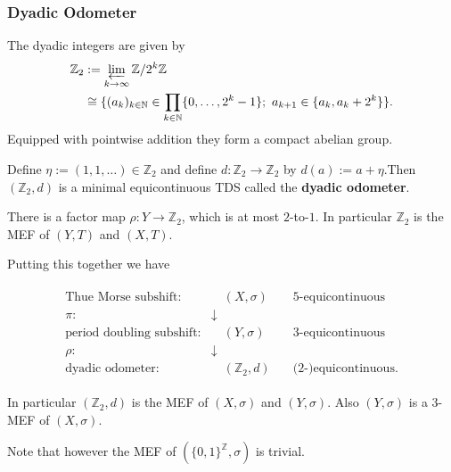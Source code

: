 \begin{frame}
	\frametitle{Dyadic Odometer}
	The dyadic integers are given by
	\begin{align*}
		\mathbb{Z}_2 &:= \varprojlim_{k \to \infty} \mathbb{Z}/2^k\mathbb{Z}\\
		&\cong \{(a_k)_{k \in \mathbb{N}} \in \prod_{k \in \mathbb{N}} \{0, \dots, 2^k-1\};\ a_{k+1} \in \{a_k, a_k + 2^k\}\}.
	\end{align*}\pause
	Equipped with pointwise addition they form a compact abelian group.\pause
	
	Define $\eta := (1, 1, \dots) \in \mathbb{Z}_2$ and define $d: \mathbb{Z}_2 \to \mathbb{Z}_2$ by $d(a) := a + \eta$.\pause Then $(\mathbb{Z}_2, d)$ is a minimal equicontinuous TDS called the \textbf{dyadic odometer}.\pause
	\medskip
	
	There is a factor map $\rho: Y \to \mathbb{Z}_2$, which is at most $2$-to-$1$. In particular $\mathbb{Z}_2$ is the MEF of $(Y, T)$ and $(X, T)$.
\end{frame}

\begin{frame}
	Putting this together we have
	\medskip
	
	\begin{align*}
		\begin{array}{rcc}
			\text{Thue Morse subshift:} &\quad (X, \sigma) \quad &5\text{-equicontinuous}\\
			\pi: &\downarrow &\\
			\text{period doubling subshift:} &\quad (Y, \sigma) \quad &3\text{-equicontinuous}\\
			\rho: &\downarrow &\\
			\text{dyadic odometer:} &\quad (\mathbb{Z}_2, d) \quad &\text{(2-)equicontinuous.}
		\end{array}
	\end{align*}\pause
	\medskip

	In particular $(\mathbb{Z}_2, d)$ is the MEF of $(X, \sigma)$ and $(Y, \sigma)$. Also $(Y, \sigma)$ is a $3$-MEF of $(X, \sigma)$.\pause
	
	Note that however the MEF of $(\{0, 1\}^\mathbb{Z}, \sigma)$ is trivial.
\end{frame}